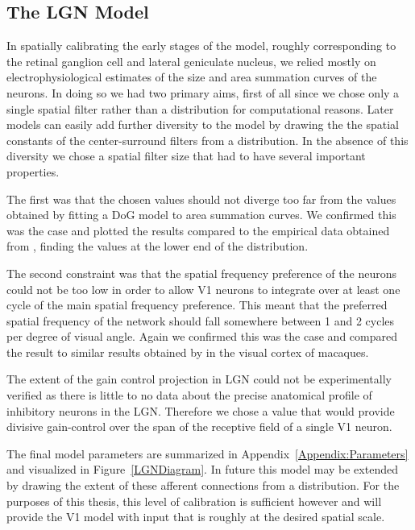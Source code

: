 \subsection{The LGN Model}

In spatially calibrating the early stages of the model, roughly
corresponding to the retinal ganglion cell and lateral geniculate
nucleus, we relied mostly on electrophysiological estimates of the
size and area summation curves of the neurons. In doing so we had two
primary aims, first of all since we chose only a single spatial filter
rather than a distribution for computational reasons. Later models can
easily add further diversity to the model by drawing the the spatial
constants of the center-surround filters from a distribution. In the
absence of this diversity we chose a spatial filter size that had to
have several important properties.

The first was that the chosen values should not diverge too far from
the values obtained by fitting a DoG model to area summation
curves. We confirmed this was the case and plotted the results
compared to the empirical data obtained from \cite{Sceniak2006},
finding the values at the lower end of the distribution.

The second constraint was that the spatial frequency preference of the
neurons could not be too low in order to allow V1 neurons to integrate
over at least one cycle of the main spatial frequency preference. This
meant that the preferred spatial frequency of the network should fall
somewhere between 1 and 2 cycles per degree of visual angle. Again we
confirmed this was the case and compared the result to similar results
obtained by \cite{Levitt2001} in the visual cortex of macaques.

The extent of the gain control projection in LGN could not be
experimentally verified as there is little to no data about the
precise anatomical profile of inhibitory neurons in the LGN. Therefore
we chose a value that would provide divisive gain-control over the
span of the receptive field of a single V1 neuron.

The final model parameters are summarized in
Appendix~\ref{Appendix:Parameters} and visualized in
Figure~\ref{LGNDiagram}. In future this model may be extended by
drawing the extent of these afferent connections from a
distribution. For the purposes of this thesis, this level of
calibration is sufficient however and will provide the V1 model with
input that is roughly at the desired spatial scale.

